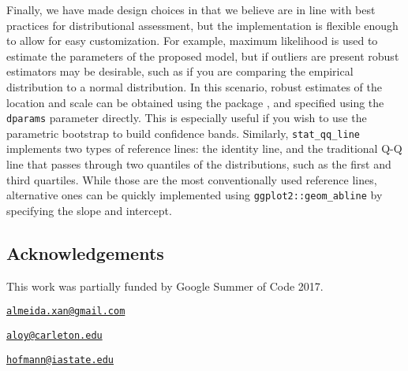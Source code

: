 Finally, we have made design choices in  that we believe
are in line with best practices for distributional assessment, but the
implementation is flexible enough to allow for easy customization. For
example, maximum likelihood is used to estimate the parameters of the
proposed model, but if outliers are present robust estimators may be
desirable, such as if you are comparing the empirical distribution to a
normal distribution. In this scenario, robust estimates of the location
and scale can be obtained using the  package
\citep{robustbase}, and specified using the \texttt{dparams} parameter
directly. This is especially useful if you wish to use the parametric
bootstrap to build confidence bands. Similarly, \texttt{stat\_qq\_line}
implements two types of reference lines: the identity line, and the
traditional Q-Q line that passes through two quantiles of the
distributions, such as the first and third quartiles. While those are
the most conventionally used reference lines, alternative ones can be
quickly implemented using \texttt{ggplot2::geom\_abline} by specifying
the slope and intercept.



\subsection{Acknowledgements}\label{acknowledgements}

This work was partially funded by Google Summer of Code 2017.

\address{%
Alexandre Almeida\\
University of Campinas\\
Institute of Computing\\ Campinas, Brazil 13083-852\\
}
\href{mailto:almeida.xan@gmail.com}{\nolinkurl{almeida.xan@gmail.com}}

\address{%
Adam Loy\\
Carleton College\\
Department of Mathematics and Statistics\\ Northfield, MN 55057\\
}
\href{mailto:aloy@carleton.edu}{\nolinkurl{aloy@carleton.edu}}

\address{%
Heike Hofmann\\
Iowa State University\\
Department of Statistics\\ Ames, IA 50011-1210\\
}
\href{mailto:hofmann@iastate.edu}{\nolinkurl{hofmann@iastate.edu}}

